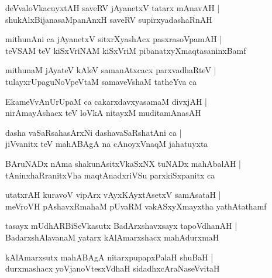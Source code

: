 \documentclass[twoside,12pt,openright]{book}
\newcounter{shloka}[chapter]
\begin{document}
\begin{shloka}
deVvaloVkacuyxtAH saveRV jAyanetxV tatarx mAnavAH |\\
shukAlxBijanasaMpanAnxH saveRV supirxyadashaRnAH
\end{shloka}

\begin{shloka}
mithunAni ca jAyanetxV sitxrXyashAcx pasxrasoVpamAH |\\
teVSAM teV kiSxVriNAM kiSxVriM pibanatxyXmaqtasaninxBamf
\end{shloka}

\begin{shloka}
mithunaM jAyateV kAleV samanAtxcacx parxvadhaRteV |\\
tulayxrUpaguNoVpeVtaM samaveVshaM tatheYva ca 
\end{shloka}

\begin{shloka}
EkameVvAnUrUpaM ca cakarxdavxyasamaM divxjAH |\\
nirAmayAshacx teV loVkA nitayxM muditamAnasAH
\end{shloka}

\begin{shloka}
dasha vaSaRsahasArxNi dashavaSaRshatAni ca |\\
jiVvanitx teV mahABAgA na cAnoyxVnaqM ja{}hatuyxta
\end{shloka}

\begin{shloka}
BAruNADx nAma shakunAsitxVkaSxNX tuNADx mahAbalAH |\\
tAninxhaRranitxVha maqtAnadxriVSu parxkiSxpanitx ca 
\end{shloka}

\begin{shloka}
utatxrAH kuravoV vipArx vAyxKAyxtAsetxV samAsataH |\\
meVroVH pAshavxRmahaM pUvaRM vakASxyXmayxtha yathAtathamf
\end{shloka}

\begin{shloka}
tasayx mUdhARBiSeVkasutx BadArxshavxsayx tapoVdhanAH |\\
BadarxshAlavanaM yatarx kAlAmarxshacx mahAdurxmaH 
\end{shloka}

\begin{shloka}
kAlAmarxsutx mahABAgA nitarxpupapxPalaH shuBaH |\\
durxmashacx yoVjanoVtesxVdhaH sidadhxcAraNaseVvitaH
\end{shloka}
\end{document}
